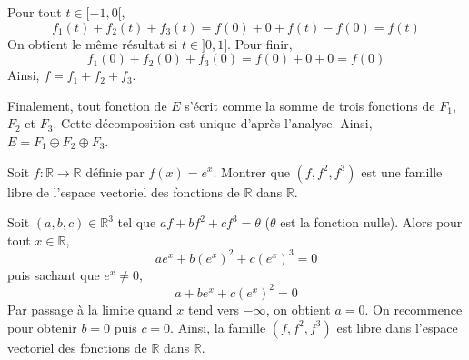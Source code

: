 \documentclass[a4paper,10pt]{report}
\begin{document}
\medskip

\noindent Pour tout $t \in [-1,0[$,
$$ f_1(t)+f_2(t)+f_3(t) = f(0) + 0 + f(t)-f(0) = f(t)$$
On obtient le même résultat si $t \in ]0,1]$. Pour finir,
$$ f_1(0)+f_2(0)+f_3(0) = f(0) + 0 + 0 = f(0)$$
Ainsi, $f=f_1+f_2+f_3$.

\medskip

\noindent Finalement, tout fonction de $E$ s'écrit comme la somme de trois fonctions de $F_1$, $F_2$ et $F_3$. Cette décomposition est unique d'après l'analyse. Ainsi, $E = F_1 \oplus F_2 \oplus F_3$.

\begin{Exercice}{} Soit $f : \mathbb{R} \rightarrow \mathbb{R}$ définie par $f(x)=e^x$. Montrer que $(f,f^2,f^3)$ est une famille libre de l'espace vectoriel des fonctions de $\mathbb{R}$ dans $\mathbb{R}$.
\end{Exercice}

\corr Soit $(a,b,c) \in \mathbb{R}^3$ tel que $af+bf^2+cf^3 = \theta$ ($\theta$ est la fonction nulle). Alors pour tout $x \in \mathbb{R}$,
$$ a e^x+ b (e^x)^2 + c(e^x)^3 = 0 $$
puis sachant que $e^x \neq 0$,
$$ a + be^x + c (e^x)^2 = 0$$
Par passage à la limite quand $x$ tend vers $- \infty$, on obtient $a=0$. On recommence pour obtenir $b=0$ puis $c=0$. Ainsi, la famille $(f,f^2,f^3)$ est libre dans l'espace vectoriel des fonctions de $\mathbb{R}$ dans $\mathbb{R}$.



%
%
%    
%    
%    
%    

%
%
%
%
%
\end{document}
